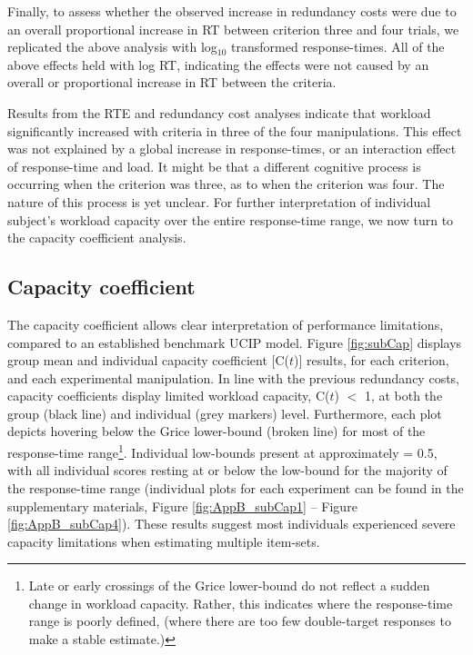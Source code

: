 Finally, to assess whether the observed increase in redundancy costs were due to an overall proportional increase in RT between criterion three and four trials, we replicated the above analysis with log$_{10}$ transformed response-times. All of the above effects held with log RT, indicating the effects were not caused by an overall or proportional increase in RT between the criteria. 

Results from the RTE and redundancy cost analyses indicate that workload significantly increased with criteria in three of the four manipulations. This effect was not explained by a global increase in response-times, or an interaction effect of response-time and load. It might be that a different cognitive process is occurring when the criterion was three, as to when the criterion was four. The nature of this process is yet unclear. %
For further interpretation of individual subject's workload capacity over the entire response-time range, we now turn to the capacity coefficient analysis.

\subsection{Capacity coefficient}
The capacity coefficient allows clear interpretation of performance limitations, compared to an established benchmark UCIP model. Figure \ref{fig:subCap} displays group mean and individual capacity coefficient [C($t$)] results, for each criterion, and each experimental manipulation. In line with the previous redundancy costs, capacity coefficients display limited workload capacity, C($t$) $<$ 1, at both the group (black line) and individual (grey markers) level. Furthermore, each plot depicts \Ct hovering below the Grice lower-bound (broken line) for most of the response-time range\footnote{Late or early crossings of the Grice lower-bound do not reflect a sudden change in workload capacity. Rather, this indicates where the response-time range is poorly defined, (\ie where there are too few double-target responses to make a stable estimate.)}. Individual low-bounds present at approximately \Ct = 0.5, with all individual \Ct scores resting at or below the low-bound for the majority of the response-time range (individual \Ct plots for each experiment can be found in the supplementary materials, Figure \ref{fig:AppB_subCap1} -- Figure \ref{fig:AppB_subCap4}). These results suggest most individuals experienced severe capacity limitations when estimating multiple item-sets.

